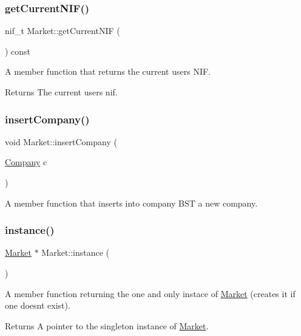 \subsubsection{\texorpdfstring{get\+Current\+N\+I\+F()}{getCurrentNIF()}}
{\footnotesize\ttfamily nif\+\_\+t Market\+::get\+Current\+N\+IF (\begin{DoxyParamCaption}{ }\end{DoxyParamCaption}) const}

A member function that returns the current user\textquotesingle{}s N\+IF. \begin{DoxyReturn}{Returns}
The current user\textquotesingle{}s nif. 
\end{DoxyReturn}
\mbox{\label{class_market_a7f1813e9aa2359dd2dee084a8ae97154}} 
\subsubsection{\texorpdfstring{insert\+Company()}{insertCompany()}}
{\footnotesize\ttfamily void Market\+::insert\+Company (\begin{DoxyParamCaption}\item[{\hyperlink{class_company}{Company}}]{c }\end{DoxyParamCaption})}

A member function that inserts into company B\+ST a new company. \mbox{\label{class_market_ab55699aa5df4c8c7a6085cdd3ddc9b38}} 
\subsubsection{\texorpdfstring{instance()}{instance()}}
{\footnotesize\ttfamily \hyperlink{class_market}{Market} $\ast$ Market\+::instance (\begin{DoxyParamCaption}{ }\end{DoxyParamCaption})\hspace{0.3cm}{\ttfamily [static]}}

A member function returning the one and only instace of \hyperlink{class_market}{Market} (creates it if one doesn\textquotesingle{}t exist). \begin{DoxyReturn}{Returns}
A pointer to the singleton instance of \hyperlink{class_market}{Market}. 
\end{DoxyReturn}
\mbox{\label{class_market_ac98d8412e09521e3db973801d642f561}} 
